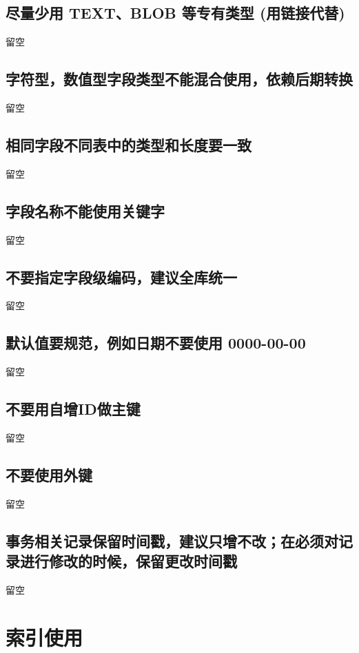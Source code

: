 \documentclass[letterpaper,10pt,english]{sphinxmanual}
\begin{document}
\section{尽量少用 TEXT、BLOB 等专有类型   (用链接代替)}
\label{1/2:textblob}\label{1/2::doc}
留空


\section{字符型，数值型字段类型不能混合使用，依赖后期转换}
\label{1/3::doc}\label{1/3:id1}
留空


\section{相同字段不同表中的类型和长度要一致}
\label{1/4::doc}\label{1/4:id1}
留空


\section{字段名称不能使用关键字}
\label{1/5::doc}\label{1/5:id1}
留空


\section{不要指定字段级编码，建议全库统一}
\label{1/6::doc}\label{1/6:id1}
留空


\section{默认值要规范，例如日期不要使用 0000-00-00}
\label{1/7::doc}\label{1/7:id1}
留空


\section{不要用自增ID做主键}
\label{1/8::doc}\label{1/8:id}
留空


\section{不要使用外键}
\label{1/9::doc}\label{1/9:id1}
留空


\section{事务相关记录保留时间戳，建议只增不改；在必须对记录进行修改的时候，保留更改时间戳}
\label{1/10::doc}\label{1/10:id1}
留空


\chapter{索引使用}
\label{2/0::doc}\label{2/0:id1}
\end{document}
